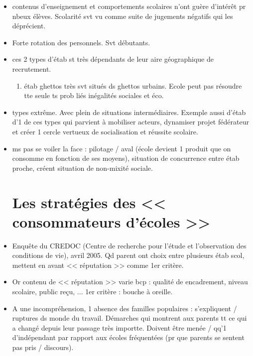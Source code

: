 \documentclass[12pt]{report}
\begin{document}
\begin{itemize}
\item contenus d'enseignement et comportements scolaires n'ont guère d'intérêt pr nbeux élèves. Scolarité svt vu comme suite de jugements négatifs qui les déprécient. \\

\item Forte rotation des personnels. Svt débutants. \\


\item ces 2 types d'étab st très dépendants de leur aire géographique de recrutement.
\begin{enumerate}
\item étab ghettos très svt situés ds ghettos urbains. Ecole peut pas résoudre tte seule ts prob liés inégalités sociales et éco. \\
\end{enumerate}

\item types extrême. Avec plein de situations intermédiaires. Exemple aussi d'étab d'1 de ces types qui parvient à mobiliser acteurs, dynamiser projet fédérateur et créer 1 cercle vertueux de socialisation et réussite scolaire. \\

\item ms pas se voiler la face : pilotage / aval (école devient 1 produit que on consomme en fonction de ses moyens), situation de concurrence entre étab proche, créent situation de non-mixité sociale. \\

\section{Les stratégies des << consommateurs d'écoles >>}

\item Enquête du CREDOC (Centre de recherche pour l'étude et l'observation des conditions de vie), avril 2005. Qd parent ont choix entre plusieurs étab scol, mettent en avant << réputation >> comme 1er critère. \\
\item Or contenu de << réputation >> varie bcp : qualité de encadrement, niveau scolaire, public reçu, ... 1er critère : bouche à oreille. \\
\item A une incompréhension, 1 absence des familles populaires : s'expliquent /  ruptures ds monde du travail. Démarches qui montrent aux parents tt ce qui a changé depuis leur passage très importte. Doivent être menée / qq'1 d'indépendant par rapport aux écoles fréquentées (pr que parents se sentent pas pris / discours). \\


\end{itemize}
\end{document}
